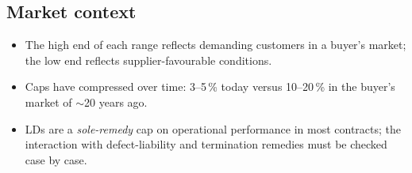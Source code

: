 \subsection{Market context}
\begin{itemize}\setlength{\itemsep}{0.2em}
  \item The high end of each range reflects demanding customers in a buyer's
        market; the low end reflects supplier-favourable conditions.
  \item Caps have compressed over time: 3--5\,\% today versus 10--20\,\% in the
        buyer's market of $\sim$20 years ago.
  \item LDs are a \emph{sole-remedy} cap on operational performance in most
        contracts; the interaction with defect-liability and termination
        remedies must be checked case by case.
\end{itemize}
